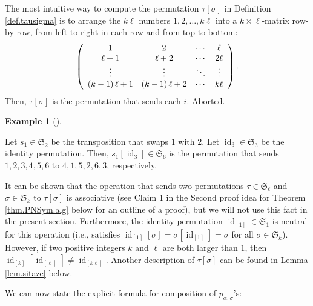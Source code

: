 \documentclass[numbers=enddot,12pt,final,onecolumn,notitlepage]{scrartcl}%
\theoremstyle{definition}
\newtheorem{exam}[theo]{Example}
\newenvironment{example}[1][]
{\begin{exam}[#1]\begin{leftbar}}
{\end{leftbar}\end{exam}}
\newenvironment{noncompile}{}{}
\begin{document}
\begin{noncompile}
The most intuitive way to compute the permutation $\tau\left[  \sigma\right]
$ in Definition \ref{def.tausigma} is to arrange the $k\ell$ numbers
$1,2,\ldots,k\ell$ into a $k\times\ell$-matrix row-by-row, from left to right
in each row and from top to bottom:%
\[
\left(
\begin{array}
[c]{cccc}%
1 & 2 & \cdots & \ell\\
\ell+1 & \ell+2 & \cdots & 2\ell\\
\vdots & \vdots & \ddots & \vdots\\
\left(  k-1\right)  \ell+1 & \left(  k-1\right)  \ell+2 & \cdots & k\ell
\end{array}
\right)  .
\]
Then, $\tau\left[  \sigma\right]  $ is the permutation that sends each $i$. Aborted.
\end{noncompile}

\begin{example}
Let $s_{1}\in\mathfrak{S}_{2}$ be the transposition that swaps $1$ with $2$.
Let $\operatorname*{id}\nolimits_{3}\in\mathfrak{S}_{3}$ be the identity
permutation. Then, $s_{1}\left[  \operatorname*{id}\nolimits_{3}\right]
\in\mathfrak{S}_{6}$ is the permutation that sends $1,2,3,4,5,6$ to
$4,1,5,2,6,3$, respectively.
\end{example}

It can be shown that the operation that sends two permutations $\tau
\in\mathfrak{S}_{\ell}$ and $\sigma\in\mathfrak{S}_{k}$ to $\tau\left[
\sigma\right]  $ is associative (see Claim 1 in the Second proof idea for
Theorem \ref{thm.PNSym.alg} below for an outline of a proof), but we will not
use this fact in the present section. Furthermore, the identity permutation
$\operatorname*{id}\nolimits_{\left[  1\right]  }\in\mathfrak{S}_{1}$ is
neutral for this operation (i.e., satisfies $\operatorname*{id}%
\nolimits_{\left[  1\right]  }\left[  \sigma\right]  =\sigma\left[
\operatorname*{id}\nolimits_{\left[  1\right]  }\right]  =\sigma$ for all
$\sigma\in\mathfrak{S}_{k}$). However, if two positive integers $k$ and $\ell$
are both larger than $1$, then $\operatorname*{id}\nolimits_{\left[  k\right]
}\left[  \operatorname*{id}\nolimits_{\left[  \ell\right]  }\right]
\neq\operatorname*{id}\nolimits_{\left[  k\ell\right]  }$. Another description
of $\tau\left[  \sigma\right]  $ can be found in Lemma \ref{lem.sitaze} below.
\medskip

We can now state the explicit formula for composition of $p_{\alpha,\sigma}$'s:
\end{document}
